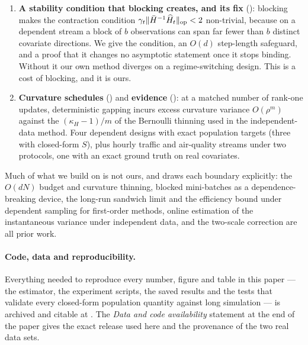 \begin{enumerate}[leftmargin=1.6em,itemsep=2pt,topsep=2pt]
      strength the largest gap between prediction and measurement is $\CovLawMaxErr$, with no fitted
      constants (). This turns a previously reported qualitative failure into a
      quantitative one.
\item \textbf{A stability condition that blocking creates, and its fix} (): blocking
      makes the contraction condition $\gamma_t\lVert \bar{H}^{-1}\widehat H_t \rVert_{\mathrm{op}}<2$ non-trivial, because on a
      dependent stream a block of $b$ observations can span far fewer than $b$ distinct covariate
      directions. We give the condition, an $O(d)$ step-length safeguard, and a proof that it changes no
      asymptotic statement once it stops binding. Without it our own method diverges on a regime-switching
      design. This is a cost of blocking, and it is ours.
\item \textbf{Curvature schedules} () and \textbf{evidence} (): at a
      matched number of rank-one updates, deterministic gapping incurs excess curvature variance
      $O(\rho^m)$ against the $(\kappa_H-1)/m$ of the Bernoulli thinning used in the independent-data
      method. Four dependent designs with exact population targets (three with closed-form $S$), plus
      hourly traffic and air-quality streams under two protocols, one with an exact ground truth on
      real covariates.
\end{enumerate}

\noindent
Much of what we build on is not ours, and  draws each boundary explicitly: the
$O(dN)$ budget and curvature thinning, blocked mini-batches as a dependence-breaking device, the
long-run sandwich limit and the efficiency bound under dependent sampling for first-order methods,
online estimation of the instantaneous variance under independent data, and the two-scale correction
are all prior work.

\paragraph{Code, data and reproducibility.}
Everything needed to reproduce every number, figure and table in this paper --- the estimator, the
experiment scripts, the saved results and the tests that validate every closed-form population
quantity against long simulation --- is archived and citable at
 \citep{kendiukhov2026bgsn}. The \emph{Data and code availability}
statement at the end of the paper gives the exact release used here and the provenance of the two
real data sets.

